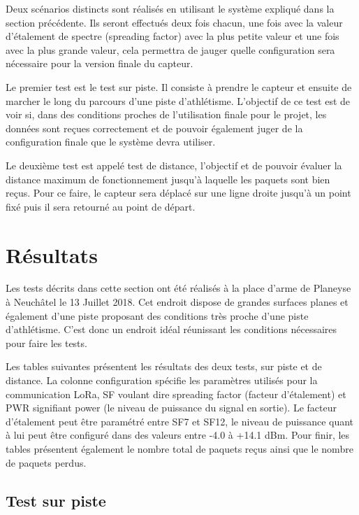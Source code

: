 Deux scénarios distincts sont réalisés en utilisant le système expliqué dans la section précédente. Ils seront effectués deux fois chacun, une fois avec la valeur d'étalement de spectre (spreading factor) avec la plus petite valeur et une fois avec la plus grande valeur, cela permettra de jauger quelle configuration sera nécessaire pour la version finale du capteur.

Le premier test est le test sur piste. Il consiste à prendre le capteur et ensuite de marcher le long du parcours d'une piste d'athlétisme. L'objectif de ce test est de voir si, dans des conditions proches de l'utilisation finale pour le projet, les données sont reçues correctement et de pouvoir également juger de la configuration finale que le système devra utiliser.

Le deuxième test est appelé test de distance, l'objectif et de pouvoir évaluer la distance maximum de fonctionnement jusqu'à laquelle les paquets sont bien reçus. Pour ce faire, le capteur sera déplacé sur une ligne droite jusqu'à un point fixé puis il sera retourné au point de départ.

\section{Résultats}

Les tests décrits dans cette section ont été réalisés à la place d'arme de Planeyse à Neuchâtel le 13 Juillet 2018. Cet endroit dispose de grandes surfaces planes et également d'une piste proposant des conditions très proche d'une piste d'athlétisme. C'est donc un endroit idéal réunissant les conditions nécessaires pour faire les tests.

Les  tables suivantes présentent les résultats des deux tests, sur piste et de distance. La colonne configuration spécifie les paramètres utilisés pour la communication LoRa, SF voulant dire spreading factor (facteur d'étalement) et PWR signifiant power (le niveau de puissance du signal en sortie).  Le facteur d'étalement peut être paramétré entre SF7 et SF12, le niveau de puissance quant à lui peut être configuré dans des valeurs entre -4.0 à +14.1 dBm.
Pour finir, les tables présentent également le nombre total de paquets reçus ainsi que le nombre de paquets perdus.

\subsection{Test sur piste}

